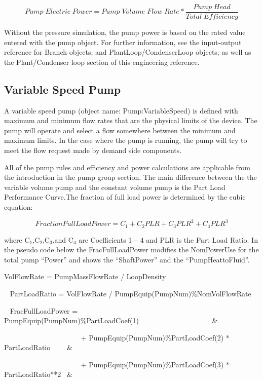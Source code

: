 \begin{equation}
Pump\;Electric\;Power = Pump\;Volume\;Flow\;Rate*\frac{{Pump\;Head}}{{Total\;Efficiency}}
\end{equation}

Without the pressure simulation, the pump power is based on the rated value entered with the pump object. For further information, see the input-output reference for Branch objects, and PlantLoop/CondenserLoop objects; as well as the Plant/Condenser loop section of this engineering reference.

\subsection{Variable Speed Pump}\label{variable-speed-pump}

A variable speed pump (object name: Pump:VariableSpeed) is defined with maximum and minimum flow rates that are the physical limits of the device. The pump will operate and select a flow somewhere between the minimum and maximum limits. In the case where the pump is running, the pump will try to meet the flow request made by demand side components.

All of the pump rules and efficiency and power calculations are applicable from the introduction in the pump group section. The main difference between the the variable volume pump and the constant volume pump is the Part Load Performance Curve.The fraction of full load power is determined by the cubic equation:

\begin{equation}
FractionFullLoadPower = {C_1} + {C_2}PLR + {C_3}PL{R^2} + {C_4}PL{R^3}
\end{equation}

where C\(_{1}\),C\(_{2}\),C\(_{3}\),and C\(_{4}\) are Coefficients 1 -- 4 and PLR is the Part Load Ratio. In the pseudo code below the FracFullLoadPower modifies the NomPowerUse for the total pump ``Power'' and shows the ``ShaftPower'' and the ``PumpHeattoFluid''.

VolFlowRate = PumpMassFlowRate / LoopDensity

~ PartLoadRatio = VolFlowRate / PumpEquip(PumpNum)\%NomVolFlowRate

~ FracFullLoadPower = ~~ PumpEquip(PumpNum)\%PartLoadCoef(1)~~~~~~~~~~~~~~~~~~~~ \&

~~~~~~~~~~~~~~~~~~~~~ + PumpEquip(PumpNum)\%PartLoadCoef(2) * PartLoadRatio~~~~ \&

~~~~~~~~~~~~~~~~~~~~~ + PumpEquip(PumpNum)\%PartLoadCoef(3) * PartLoadRatio**2~ \&

